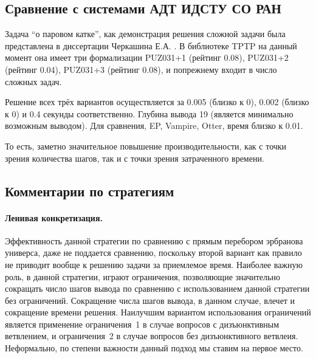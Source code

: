 


\subsection{Сравнение с системами АДТ ИДСТУ СО РАН}
Задача ``о паровом катке'', как демонстрация решения сложной задачи была представлена в диссертации Черкашина Е.А. \cite{dissChe}.
В библиотеке TPTP на данный момент она имеет три формализации PUZ031+1 (рейтинг 0.08), PUZ031+2 (рейтинг 0.04), PUZ031+3 (рейтинг 0.08), и попрежнему входит в число сложных задач.

Решение всех трёх вариантов осуществляется за 0.005 (близко к 0), 0.002 (близко к 0) и 0.4 секунды соответственно. Глубина вывода 19 (является минимально возможным выводом). Для сравнения, EP, Vampire, Otter, время близко к 0.01. 

То есть, заметно значительное повышение производительности, как с точки зрения количества шагов, так и с точки зрения затраченного времени.



\subsection{Комментарии по стратегиям}

\paragraph{Ленивая конкретизация.}
Эффективность данной стратегии по сравнению с прямым перебором эрбранова универса, даже не поддается сравнению, поскольку второй вариант как правило не приводит вообще к решению задачи за приемлемое время. Наиболее важную роль, в данной стратегии, играют ограничения, позволяющие значительно сокращать число шагов вывода по сравнению с использованием данной стратегии без ограничений. Сокращение числа шагов вывода, в данном случае, влечет и сокращение времени решения. Наилучшим вариантом использования ограничений является применение ограничения~1 в случае вопросов с дизъюнктивным ветвлением, и ограничения~2 в случае вопросов без дизъюнктивного ветвлеия. Неформально, по степени важности данный подход мы ставим на первое место.

